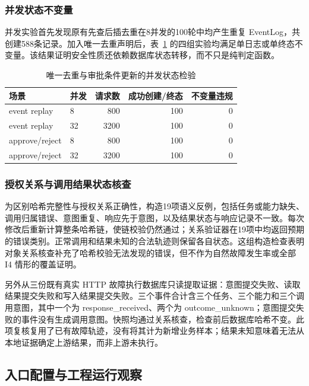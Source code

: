 \subsubsection{并发状态不变量}

并发实验首先发现原有先查后插去重在8并发的100轮中均产生重复 EventLog，共创建588条记录。加入唯一去重声明后，表~\ref{tab:concurrency-v11} 的四组实验均满足单日志或单终态不变量。该结果证明安全性质还依赖数据库状态转移，而不只是纯判定函数。

\begin{table}[htbp]
\centering
\caption{唯一去重与审批条件更新的并发状态检验}
\label{tab:concurrency-v11}
\small
\begin{tabular}{llrrr}
\toprule
场景 & 并发 & 请求数 & 成功创建/终态 & 不变量违规 \\
\midrule
event replay & 8 & 800 & 100 & 0 \\
event replay & 32 & 3200 & 100 & 0 \\
approve/reject & 8 & 800 & 100 & 0 \\
approve/reject & 32 & 3200 & 100 & 0 \\
\bottomrule
\end{tabular}
\end{table}

\subsubsection{授权关系与调用结果状态核查}
\label{sec:evidence-rr022}

为区别哈希完整性与授权关系正确性，构造19项语义反例，包括任务或能力缺失、调用归属错误、意图重复、响应先于意图，以及结果状态与响应记录不一致。每次修改后重新计算整条哈希链，使链校验仍然通过；关系验证器在19项中均返回预期的错误类别。正常调用和结果未知的合法轨迹则保留各自状态。这组构造检查表明对象关系核查补充了哈希校验无法发现的错误，但不作为自然故障发生率或全部 I4 情形的覆盖证明。

另外从三份既有真实 HTTP 故障执行数据库只读提取证据：意图提交失败、读取结果提交失败和写入结果提交失败。三个事件合计含三个任务、三个能力和三个调用意图，其中一个为 response\_received、两个为 outcome\_unknown；意图提交失败的事件没有生成调用意图。快照均通过关系核查，检查前后数据库哈希不变。此项复核复用了已有故障轨迹，没有将其计为新增业务样本；结果未知意味着无法从本地证据确定上游结果，而非上游未执行。

\subsection{入口配置与工程运行观察}
\label{sec:engineering-rr022}

